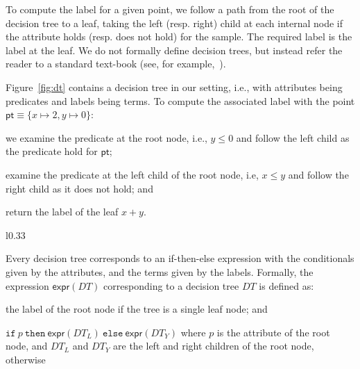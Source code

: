\documentclass{llncs}
\newcommand\Point{\mathsf{pt}}
\newcommand\Pred{p}
\newcommand\ITE[3]{\mathtt{if}~#1~\mathtt{then}~#2~\mathtt{else}~#3}
\newcommand\DecisionTree{\mathit{DT}}
\newcommand\DTtoExpr[1]{\mathsf{expr}(#1)}
\newcommand\node{v}
\begin{document}
To compute the label for a given point, we follow a path from the root
of the decision tree to a leaf, taking the left (resp. right) child at
each internal node if the attribute holds (resp.  does not hold) for the
sample.
The required label is the label at the leaf.
We do not formally define decision trees, but instead refer the reader
to a standard text-book (see, for example,~\cite{bishop-book}).

\begin{example}
  Figure~\ref{fig:dt} contains a decision tree in our setting, i.e.,
  with attributes being predicates and labels being terms.
  To compute the associated label with the point $\Point \equiv \{ x
  \mapsto 2, y \mapsto 0 \}$:
  \begin{inparaenum}[(a)]
  \item we examine the predicate at the root node, i.e., $y \leq 0$ and
    follow the left child as the predicate hold for $\Point$;
  \item examine the predicate at the left child of the root node, i.e,
    $x \leq y$ and follow the right child as it does not hold; and
  \item return the label of the leaf $x + y$.
  \end{inparaenum}
\end{example}

\begin{wrapfigure}{l}{0.33\textwidth}
  \caption{Sample decision tree}
  \label{fig:dt}
\end{wrapfigure}
Every decision tree corresponds to an if-then-else expression with the
conditionals given by the attributes, and the terms given by the labels.
Formally, the expression $\DTtoExpr{\DecisionTree}$ corresponding to a
decision tree $\DecisionTree$ is defined as:
\begin{inparaenum}[(a)]
\item the label of the root node if the tree is a single leaf node; and
\item
  $\ITE{\Pred}{\DTtoExpr{\DecisionTree_L}}{\DTtoExpr{\DecisionTree_Y}}$
  where $\Pred$ is the attribute of the root node, and $\DecisionTree_L$ and
  $\DecisionTree_Y$ are the left and right children of the root node,
  otherwise
\end{inparaenum}
\end{document}
